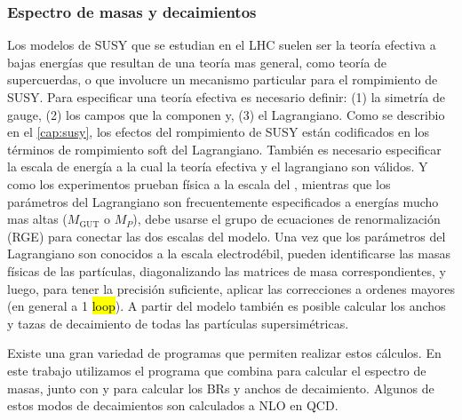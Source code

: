 



\subsubsection{Espectro de masas y decaimientos}

Los modelos de SUSY que se estudian en el LHC suelen ser la teoría efectiva a
bajas energías que resultan de una teoría mas general, como teoría de
supercuerdas, o que involucre un mecanismo particular para el rompimiento de
SUSY. Para especificar una teoría efectiva es necesario definir: (1) la simetría
de gauge, (2) los campos que la componen y, (3) el Lagrangiano. Como se describio
en el \cref{cap:susy}, los efectos del
rompimiento de SUSY están codificados en los términos de rompimiento soft del
Lagrangiano.
También es necesario especificar la escala de energía a la cual la
teoría efectiva y el lagrangiano son válidos. Y como los experimentos prueban
física a la escala del {\tev}, mientras que los parámetros del
Lagrangiano son frecuentemente especificados a energías mucho mas altas
($M_\text{GUT}$ o $M_P$), debe usarse el grupo de ecuaciones de renormalización
(RGE) para conectar las dos escalas del modelo. Una vez que los parámetros del
Lagrangiano son conocidos a la escala electrodébil, pueden identificarse las
masas físicas de las partículas, diagonalizando las matrices de masa
correspondientes, y luego, para tener la precisión suficiente, aplicar las
correcciones a ordenes mayores (en general a 1 \hl{loop}). A partir del modelo
también es posible calcular los anchos y tazas de decaimiento de todas las
partículas supersimétricas.

Existe una gran variedad de programas que permiten realizar estos cálculos.
En este trabajo utilizamos el programa
{\susyhit}\cite{Djouadi:2006bz} que combina {\suspect}\cite{Djouadi2007426}
para calcular el espectro de masas, junto
con {\sdecay}\cite{Muhlleitner:2004mka} y {\hdecay}\cite{Djouadi:1997yw}
para calcular los BRs y anchos de decaimiento. Algunos de estos modos de
decaimientos son calculados a NLO en QCD.


